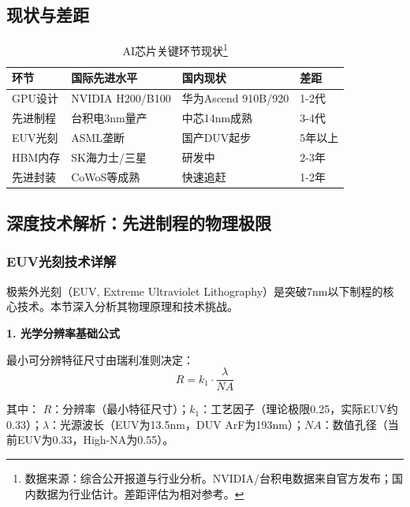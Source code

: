 \subsection{现状与差距}

\begin{table}[H]
\centering
\caption{AI芯片关键环节现状\protect\footnote{数据来源：综合公开报道与行业分析。NVIDIA/台积电数据来自官方发布；国内数据为行业估计。差距评估为相对参考。}}
\small
\begin{tabular}{p{2.5cm}p{3.5cm}p{3.5cm}p{2.5cm}}
\toprule
\textbf{环节} & \textbf{国际先进水平} & \textbf{国内现状} & \textbf{差距} \\
\midrule
GPU设计 & NVIDIA H200/B100 & 华为Ascend 910B/920 & 1-2代 \\
先进制程 & 台积电3nm量产 & 中芯14nm成熟 & 3-4代 \\
EUV光刻 & ASML垄断 & 国产DUV起步 & 5年以上 \\
HBM内存 & SK海力士/三星 & 研发中 & 2-3年 \\
先进封装 & CoWoS等成熟 & 快速追赶 & 1-2年 \\
\bottomrule
\end{tabular}
\end{table}


\subsection{深度技术解析：先进制程的物理极限}

\subsubsection{EUV光刻技术详解}

极紫外光刻（EUV, Extreme Ultraviolet Lithography）是突破7nm以下制程的核心技术。本节深入分析其物理原理和技术挑战\cite{ASML2024EUV, NaturePhotonics2023EUV, SolidStateElectronics2024}。

\textbf{1. 光学分辨率基础公式}

最小可分辨特征尺寸由瑞利准则决定：
\begin{equation}
R = k_1 \cdot \frac{\lambda}{NA}
\end{equation}

其中：
$R$：分辨率（最小特征尺寸）；$k_1$：工艺因子（理论极限0.25，实际EUV约0.33）；$\lambda$：光源波长（EUV为13.5nm，DUV ArF为193nm）；$NA$：数值孔径（当前EUV为0.33，High-NA为0.55）。

